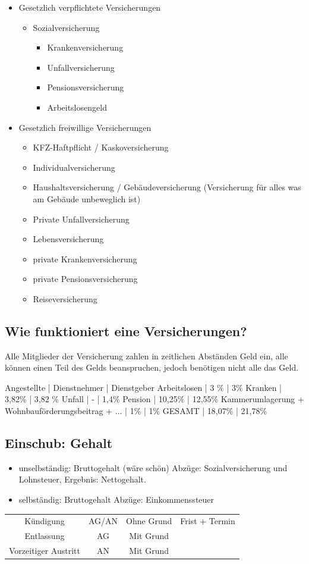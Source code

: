 \documentclass[a4paper]{report}
\begin{document}
\begin{itemize}
\item Gesetzlich verpflichtete Versicherungen
	\begin{itemize}
	\item Sozialversicherung
		\begin{itemize}
		\item Krankenversicherung
		\item Unfallversicherung
		\item Pensionsversicherung
		\item Arbeitslosengeld
		\end{itemize}
	\end{itemize}
\item Gesetzlich freiwillige Versicherungen
	\begin{itemize}
	\item KFZ-Haftpflicht / Kaskoversicherung
	\item Individualversicherung
	\item Haushaltsversicherung / Gebäudeversicherung (Versicherung für alles was am Gebäude unbeweglich ist)
	\item Private Unfallversicherung
	\item Lebensversicherung
	\item private Krankenversicherung
	\item private Pensionsversicherung
	\item Reiseversicherung
	\end{itemize}
\end{itemize}

\subsection{Wie funktioniert eine Versicherungen?}

Alle Mitglieder der Versicherung zahlen in zeitlichen Abständen Geld ein, alle können einen Teil des Gelds beanspruchen, jedoch benötigen nicht alle das Geld.

Angestellte | Dienstnehmer | Dienstgeber
Arbeitslosen | 3 \% | 3\%
Kranken | 3,82\% | 3,82 \%
Unfall | - | 1,4\%
Pension | 10,25\% | 12,55\%
Kammerumlagerung + Wohnbauförderungsbeitrag + ... | 1\% | 1\%
GESAMT | 18,07\% | 21,78\%

\subsection{Einschub: Gehalt}

\begin{itemize}
\item unselbständig: Bruttogehalt (wäre schön) Abzüge: Sozialversicherung und Lohnsteuer, Ergebnis: Nettogehalt.
\item selbständig: Bruttogehalt Abzüge: Einkommenssteuer
\end{itemize}

\begin{tabular}{c|c|c|c}
Kündigung & AG/AN & Ohne Grund & Frist + Termin\\
Entlassung & AG & Mit Grund\\
Vorzeitiger Austritt & AN & Mit Grund
\end{tabular}
\end{document}
